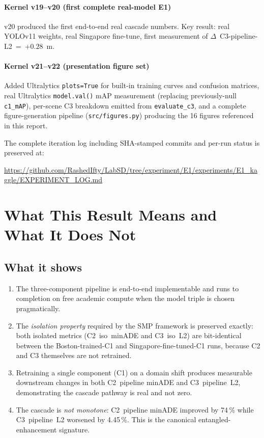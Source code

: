 \documentclass[11pt,a4paper]{article}
\begin{document}
\paragraph{Kernel v19--v20 (first complete real-model E1)} v20
produced the first end-to-end real cascade numbers. Key result: real
YOLOv11 weights, real Singapore fine-tune, first measurement of
$\Delta$~C3-pipeline-L2~=~$+0.28$~m.

\paragraph{Kernel v21--v22 (presentation figure set)} Added
Ultralytics \texttt{plots=True} for built-in training curves and
confusion matrices, real Ultralytics \texttt{model.val()} mAP
measurement (replacing previously-null \texttt{c1\_mAP}), per-scene
C3 breakdown emitted from \texttt{evaluate\_c3}, and a complete
figure-generation pipeline (\texttt{src/figures.py}) producing the 16
figures referenced in this report.

The complete iteration log including SHA-stamped commits and per-run
status is preserved at:
\begin{center}
\url{https://github.com/RashedIfty/LabSD/tree/experiment/E1/experiments/E1_kaggle/EXPERIMENT_LOG.md}
\end{center}

\section{What This Result Means and What It Does Not}

\subsection{What it shows}

\begin{enumerate}[noitemsep]
    \item The three-component pipeline is end-to-end implementable
          and runs to completion on free academic compute when the
          model triple is chosen pragmatically.
    \item The \emph{isolation property} required by the SMP framework
          is preserved exactly: both isolated metrics (C2~iso~minADE
          and C3~iso~L2) are bit-identical between the
          Boston-trained-C1 and Singapore-fine-tuned-C1 runs, because
          C2 and C3 themselves are not retrained.
    \item Retraining a single component (C1) on a domain shift
          produces measurable downstream changes in both C2~pipeline
          minADE and C3~pipeline~L2, demonstrating the cascade pathway
          is real and not zero.
    \item The cascade is \emph{not monotone}: C2~pipeline minADE
          improved by 74\,\% while C3~pipeline~L2 worsened by 4.45\,\%.
          This is the canonical entangled-enhancement signature.
\end{enumerate}
\end{document}
